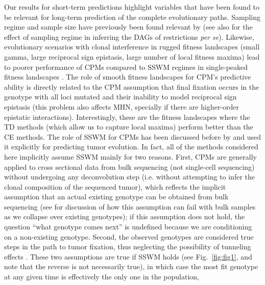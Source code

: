 \documentclass[a4paper,10pt]{article}
\begin{document}
Our results for short-term predictions highlight variables that have been
found to be relevant for long-term prediction of the complete evolutionary
paths.  Sampling regime and sample size have previously been found
relevant by \cite{diaz-uriarte2019a,hosseini2019a} (see also
\cite{Diaz-Uriarte2015, diaz-uriarte2018} for the effect of sampling regime
in inferring the DAGs of restrictions \textit{per se}). Likewise,
evolutionary scenarios with clonal interference in rugged fitness
landscapes (small gamma, large reciprocal sign epistasis, large number of
local fitness maxima) lead to poorer performance of CPMs compared to SSWM
regimes in single-peaked fitness landscapes
\cite{diaz-uriarte2019a,hosseini2019a}. %
The role of smooth fitness landscapes for CPM's predictive ability is
directly related to the CPM assumption that final fixation occurs in the
genotype with all loci mutated and their inability to model reciprocal
sign epistasis \cite{diaz-uriarte2018} (this problem also affects MHN,
specially if there are higher-order epistatic
interactions). Interestingly, these are the fitness landscapes where the
TD methods (which allow us to capture local maxima) perform better than
the CE methods. The role of SSWM for CPMs has been discussed before by
\cite{Sprouffske2011, diaz-uriarte2019a} and \cite{hosseini2019a} used it
explicitly for predicting tumor evolution. In fact, all of the methods
considered here implicitly assume SSWM mainly for two reasons. First, CPMs
are generally applied to cross sectional data from bulk sequencing (not
single-cell sequencing) without undergoing any deconvolution step
(i.e. without attempting to infer the clonal composition of the sequenced
tumor), which reflects the implicit assumption that an actual existing
genotype can be obtained from bulk sequencing (see
\cite{alves_multiregional_2017} for discussion of how this assumption can
fail with bulk samples as we collapse over existing genotypes); if this
assumption does not hold, the question ``what genotype comes next'' is
undefined because we are conditioning on a non-existing genotype.  Second,
the observed genotypes are considered true steps in the path to tumor
fixation, thus neglecting the possibility of tunneling effects
\cite{devisser_empirical_2014,szendro_predictability_2013,sniegowski_beneficial_2010}. These
two assumptions are true if SSWM holds (see Fig.~\ref{fig:fig1}, and note
that the reverse is not necessarily true), in which case the most fit
genotype at any given time is effectively the only one in the population,
\end{document}
